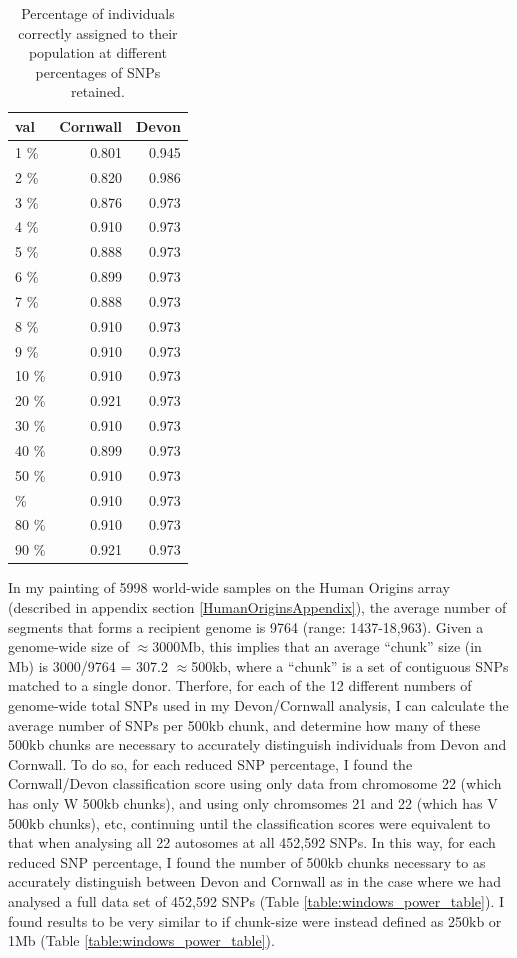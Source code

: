 \begin{table}
\centering
\begin{tabular}[t]{lrr}
\toprule
val & Cornwall & Devon\\
\midrule
1 \% & 0.801 & 0.945\\
2 \% & 0.820 & 0.986\\
3 \% & 0.876 & 0.973\\
4 \% & 0.910 & 0.973\\
5 \% & 0.888 & 0.973\\
6 \% & 0.899 & 0.973\\
7 \% & 0.888 & 0.973\\
8 \% & 0.910 & 0.973\\
9 \% & 0.910 & 0.973\\
10 \% & 0.910 & 0.973\\
20 \% & 0.921 & 0.973\\
30 \% & 0.910 & 0.973\\
40 \% & 0.899 & 0.973\\
50 \% & 0.910 & 0.973\\
\addlinespace
70 \% & 0.910 & 0.973\\
80 \% & 0.910 & 0.973\\
90 \% & 0.921 & 0.973\\
\bottomrule
\end{tabular}
\label{tab:prob_assignment_DevCorn}
\caption{Percentage of individuals correctly assigned to their population at different percentages of SNPs retained.}
\end{table}


In my painting of 5998 world-wide samples on the Human Origins array (described in appendix section \ref{HumanOriginsAppendix}), the average number of segments that forms a recipient genome is 9764 (range: 1437-18,963). Given a genome-wide size of $\approx$3000Mb, this implies that an average ``chunk'' size (in Mb) is 3000/9764 = 307.2 $\approx$500kb, where a ``chunk'' is a set of contiguous SNPs matched to a single donor. Therfore, for each of the 12 different numbers of genome-wide total SNPs used in my Devon/Cornwall analysis, I can calculate the average number of SNPs per 500kb chunk, and determine how many of these 500kb chunks are necessary to accurately distinguish individuals from Devon and Cornwall. To do so, for each reduced SNP percentage, I found the Cornwall/Devon classification score using only data from chromosome 22 (which has only W 500kb chunks), and using only chromsomes 21 and 22 (which has V 500kb chunks), etc, continuing until the classification scores were equivalent to that when analysing all 22 autosomes at all 452,592 SNPs. In this way, for each reduced SNP percentage, I found the number of 500kb chunks necessary to as accurately distinguish between Devon and Cornwall as in the case where we had analysed a full data set of 452,592 SNPs (Table \ref{table:windows_power_table}). I found results to be very similar to if chunk-size were instead defined as 250kb or 1Mb (Table \ref{table:windows_power_table}).


